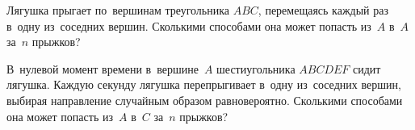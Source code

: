 \begin{problems}
\item
Лягушка прыгает по~вершинам треугольника $ABC$, перемещаясь каждый раз в~одну
из~соседних вершин.
Сколькими способами она может попасть из~$A$ в~$A$ за~$n$ прыжков?

\item
В~нулевой момент времени в~вершине~$A$ шестиугольника $ABCDEF$ сидит лягушка.
Каждую секунду лягушка перепрыгивает в~одну из~соседних вершин, выбирая
направление случайным образом равновероятно.
Сколькими способами она может попасть из~$A$ в~$C$ за~$n$ прыжков?

\end{problems}

